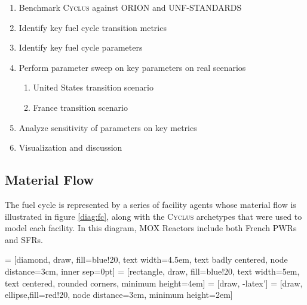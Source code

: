 \documentclass{article}
\newcommand{\Cyclus}{\textsc{Cyclus}\xspace}%
\begin{document}
\begin{enumerate}
    \item Benchmark \Cyclus against ORION and \gls{UNF-STANDARDS}
    \item Identify key fuel cycle transition metrics
    \item Identify key fuel cycle parameters
    \item Perform parameter sweep on key parameters on real scenarios
    \begin{enumerate}
        \item United States transition scenario
        \item France transition scenario
    \end{enumerate}
    \item Analyze sensitivity of parameters on key metrics
    \item Visualization and discussion
\end{enumerate}

\subsection{Material Flow}

The fuel cycle is represented by a series of facility agents whose material 
flow is illustrated in figure \ref{diag:fc}, along with
the \Cyclus archetypes that were used to model each facility.
In this diagram, \gls{MOX} Reactors include both French \glspl{PWR} and 
\glspl{SFR}.

 = [diamond, draw, fill=blue!20, 
text width=4.5em, text badly centered, node distance=3cm, inner sep=0pt]
 = [rectangle, draw, fill=blue!20, 
text width=5em, text centered, rounded corners, minimum height=4em]
 = [draw, -latex']
 = [draw, ellipse,fill=red!20, node distance=3cm,
minimum height=2em]
\end{document}
